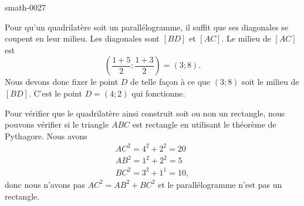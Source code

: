 
\begin{corrige}{smath-0027}

    Pour qu'un quadrilatère soit un parallélogramme, il suffit que ses diagonales se coupent en leur milieu. Les diagonales sont \( [BD]\) et \( [AC]\). Le milieu de \( [AC] \) est 
    \begin{equation}
        \left( \frac{ 1+5 }{2};\frac{ 1+3 }{2} \right)=(3;8).
    \end{equation}
    Nous devons donc fixer le point \( D\) de telle façon à ce que \( (3;8)\) soit le milieu de \( [BD]\). C'est le point \( D=(4;2)\) qui fonctionne.

    Pour vérifier que le quadrilatère ainsi construit soit ou non un rectangle, nous pouvons vérifier si le triangle \( ABC\) est rectangle en utilisant le théorème de Pythagore. Nous avons
    \begin{subequations}
        \begin{align}
            AC^2=4^2+2^2=20\\
            AB^2=1^2+2^2=5\\
            BC^2=3^2+1^1=10,
        \end{align}
    \end{subequations}
    donc nous n'avons pas \( AC^2=AB^2+BC^2\) et le parallélogramme n'est pas un rectangle.

\end{corrige}
